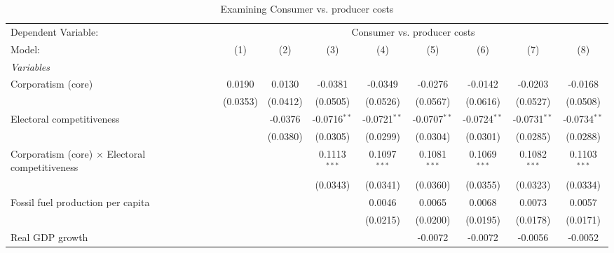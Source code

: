 
\begin{table}[htbp]
   \caption{Examining Consumer vs. producer costs}
   \centering
   \begin{tabular}{lcccccccc}
      \tabularnewline \midrule \midrule
      Dependent Variable: & \multicolumn{8}{c}{Consumer vs. producer costs}\\
      Model:                                                 & (1)      & (2)      & (3)            & (4)            & (5)            & (6)            & (7)            & (8)\\  
      \midrule
      \emph{Variables}\\
      Corporatism (core)                                     & 0.0190   & 0.0130   & -0.0381        & -0.0349        & -0.0276        & -0.0142        & -0.0203        & -0.0168\\   
                                                             & (0.0353) & (0.0412) & (0.0505)       & (0.0526)       & (0.0567)       & (0.0616)       & (0.0527)       & (0.0508)\\   
      Electoral competitiveness                              &          & -0.0376  & -0.0716$^{**}$ & -0.0721$^{**}$ & -0.0707$^{**}$ & -0.0724$^{**}$ & -0.0731$^{**}$ & -0.0734$^{**}$\\   
                                                             &          & (0.0380) & (0.0305)       & (0.0299)       & (0.0304)       & (0.0301)       & (0.0285)       & (0.0288)\\   
      Corporatism (core) $\times$ Electoral competitiveness  &          &          & 0.1113$^{***}$ & 0.1097$^{***}$ & 0.1081$^{***}$ & 0.1069$^{***}$ & 0.1082$^{***}$ & 0.1103$^{***}$\\   
                                                             &          &          & (0.0343)       & (0.0341)       & (0.0360)       & (0.0355)       & (0.0323)       & (0.0334)\\   
      Fossil fuel production per capita                      &          &          &                & 0.0046         & 0.0065         & 0.0068         & 0.0073         & 0.0057\\   
                                                             &          &          &                & (0.0215)       & (0.0200)       & (0.0195)       & (0.0178)       & (0.0171)\\   
      Real GDP growth                                        &          &          &                &                & -0.0072        & -0.0072        & -0.0056        & -0.0052\\   

\end{tabular}
\end{table}
